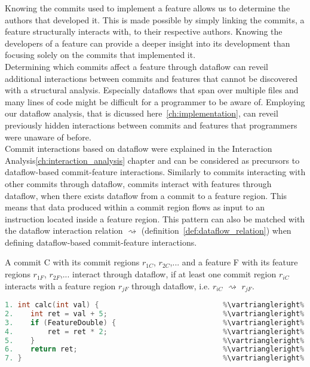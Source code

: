 Knowing the commits used to implement a feature allows us to determine the authors that developed it.
This is made possible by simply linking the commits, a feature structurally interacts with, to their respective authors.
Knowing the developers of a feature can provide a deeper insight into its development than focusing solely on the commits that implemented it. \\

Determining which commits affect a feature through dataflow can reveil additional interactions between commits and features that cannot be discovered with a structural analysis.
Especially dataflows that span over multiple files and many lines of code might be difficult for a programmer to be aware of.
Employing our dataflow analysis, that is dicussed here~\ref{ch:implementation}, can reveil previously hidden interactions between commits and features that programmers were unaware of before. \\
Commit interactions based on dataflow were explained in the Interaction Analysis\ref{ch:interaction_analysis} chapter and can be considered as precursors to dataflow-based commit-feature interactions.
Similarly to commits interacting with other commits through dataflow, commits interact with features through dataflow, when there exists dataflow from a commit to a feature region.
This means that data produced within a commit region flows as input to an instruction located inside a feature region.
This pattern can also be matched with the dataflow interaction relation $\rightsquigarrow$ (definition~\ref{def:dataflow_relation}) when defining dataflow-based commit-feature interactions.

\begin{definition}\label{def:dataflow_cfi}
A commit C with its commit regions $r_{1C}$, $r_{2C}$,... and a feature F with its feature regions $r_{1F}$, $r_{2F}$,... interact through dataflow, if at least one commit region $r_{iC}$ interacts with a feature region $r_{jF}$ through dataflow, i.e. $r_{iC}$ $\rightsquigarrow$ $r_{jF}$.
\end{definition}

\begin{lstlisting}[language=C++, caption={Commit Feature Interactions}, label=DescriptiveLabel]	
1. int calc(int val) {                             %\vartriangleright% %\texttt{d93df4a}%
2.    int ret = val + 5;                           %\vartriangleright% %\texttt{7edb283}%
3.    if (FeatureDouble) {                         %\vartriangleright% %\texttt{fc3a17d}%    %\vartriangleright% %FeatureDouble%
4.        ret = ret * 2;                           %\vartriangleright% %\texttt{fc3a17d}%    %\vartriangleright% %FeatureDouble%
5.    }                                            %\vartriangleright% %\texttt{fc3a17d}%    %\vartriangleright% %FeatureDouble%
6.    return ret;                                  %\vartriangleright% %\texttt{d93df4a}%   
7. }                                               %\vartriangleright% %\texttt{d93df4a}%   
\end{lstlisting}

